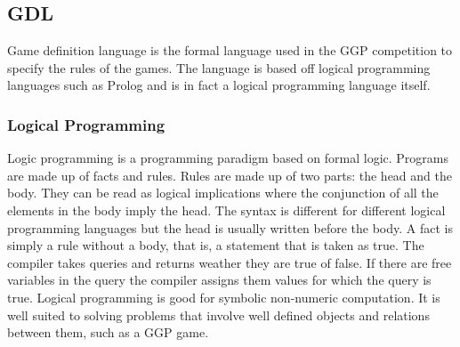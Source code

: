 \subsection{GDL}\label{sec:GDL}
Game definition language is the formal language used in the GGP competition to specify the rules of the games.\cite{GDL_Spec} The language is based off logical programming languages such as Prolog and is in fact a logical programming language itself. 
\subsubsection{Logical Programming}
Logic programming is a programming paradigm based on formal logic. Programs are made up of facts and rules. Rules are made up of two parts: the head and the body. They can be read as logical implications where the conjunction of all the elements in the body imply the head. The syntax is different for different logical programming languages but the head is usually written before the body. A fact is simply a rule without a body, that is, a statement that is taken as true. The compiler takes queries and returns weather they are true of false. If there are free variables in the query the compiler assigns them values for which the query is true. Logical programming is good for symbolic non-numeric computation. It is well suited to solving problems that involve well defined objects and relations between them, such as a GGP game.
